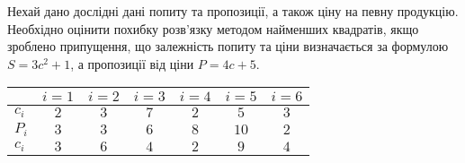 \documentclass[a4paper,oneside,DIV=12,12pt]{scrartcl}
\begin{document}
	\begin{exercise}
		Нехай дано дослідні дані попиту та пропозиції, а також ціну на певну продукцію. Необхідно оцінити похибку розв'язку методом найменших квадратів, якщо зроблено припущення, що залежність попиту та ціни визначається за формулою $S = 3c^2 + 1$, а пропозиції від ціни $P = 4c + 5$.
		
		\begin{longtable}[c]{lcccccc}
			\toprule
				      & $i = 1$ & $i = 2$ & $i = 3$ & $i = 4$ & $i = 5$ & $i = 6$\\
			\midrule
			\endhead
			\bottomrule
			\endfoot
			
				$c_i$ & $2$ & $3$ & $7$ & $2$ & $5$  & $3$ \\
				$P_i$ & $3$ & $3$ & $6$ & $8$ & $10$ & $2$ \\
				$c_i$ & $3$ & $6$ & $4$ & $2$ & $9$  & $4$ \\
		\end{longtable}
	\end{exercise}
	
\end{document}
